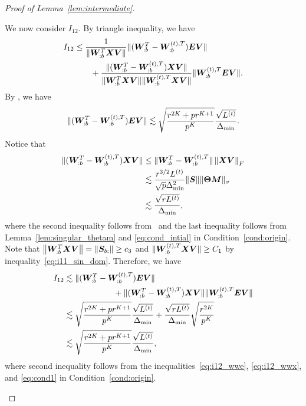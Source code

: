 \documentclass[journal]{IEEEtran}
\theoremstyle{definition}
\theoremstyle{definition}
\begin{document}
\begin{proof}[Proof of Lemma~\ref{lem:intermediate}]
\begin{enumerate}[wide]
    
    
    We now consider $I_{12}$. By triangle inequality, we have 
    \begin{align}
        I_{12} &\leq \frac{1}{\lVert  \bm{W}_{:b}^T \bm X \bm{V} \rVert}\lVert (\bm{W}_{:b}^T - \bm{W}_{:b}^{(t),T}) \bm{E} \bm{V} \rVert\\
        &\quad \quad + \frac{ \lVert(\bm{W}_{:b}^T - \bm{W}_{:b}^{(t),T}) \bm X \bm{V}\rVert }{\lVert  \bm{W}_{:b}^T \bm X \bm{V} \rVert \lVert  \bm{W}_{:b}^{(t),T} \bm X \bm{V} \rVert }\lVert \bm{W}_{:b}^{(t),T} \bm{E} \bm{V}\rVert.
    \end{align}
    By \cite[Proof of Lemma 5]{han2020exact}, we have 
    \begin{equation}\label{eq:i12_wwe}
        \onormSize{}{ (\mW_{:b}^T - \mW_{:b}^{(t),T}) \mE \mV }  \lesssim \sqrt{\frac{ r^{2K} + p r^{K+1}}{p^K}} \frac{\sqrt{L^{(t)}}}{\Delta_{\min}}.
    \end{equation}
    Notice that 
    \begin{align}
        \onormSize{}{(\mW_{:b}^T - \mW_{:b}^{(t),T}) \mX \mV} &\leq \onormSize{}{\mW_{:b}^T - \mW_{:b}^{(t),T}} \onorm{\mX\mV}_F \\
        &\lesssim \frac{r^{3/2}L^{(t)}}{\sqrt{p}\Delta_{\min}^2} \onormSize{}{\mS} \onormSize{}{\mTheta \mM}_{\sigma} \\
        &\lesssim \frac{ \sqrt{r L^{(t)}} }{\Delta_{\min}}, \label{eq:i12_wwx}
    \end{align}
    where the second inequality follows from~\cite[Inequality (121), Proof of Lemma 5]{han2020exact} and the last inequality follows from Lemma~\ref{lem:singular_thetam} and \eqref{eq:cond_intial} in Condition~\ref{cond:origin}.
     Note that $\left\lVert\bm{W}_{:b}^T \bm X \bm{V}\right\rVert = \left\lVert\bm S_{b:}\right\rVert \geq c_3$ and $\lVert  \bm{W}_{:b}^{(t),T} \bm X \bm{V} \rVert \geq C_1$ by inequality~\eqref{eq:i11_sin_dom}. Therefore, we have 
     \begin{align}
         I_{12} &\lesssim  \onormSize{}{ (\mW_{:b}^T - \mW_{:b}^{(t),T}) \mE \mV } \\
         & \quad \quad  \quad \quad  \quad \quad +   \onormSize{}{(\mW_{:b}^T - \mW_{:b}^{(t),T}) \mX \mV}   \onormSize{}{ \mW_{:b}^{(t),T} \mE \mV} \\
         &\lesssim \sqrt{\frac{ r^{2K} + p r^{K+1}}{p^K}} \frac{\sqrt{L^{(t)}}}{\Delta_{\min}} + \frac{ \sqrt{r L^{(t)}} }{\Delta_{\min}}\sqrt{\frac{r^{2K}}{p^K}} \\
         & \lesssim \sqrt{\frac{ r^{2K} + p r^{K+1}}{p^K}} \frac{\sqrt{L^{(t)}}}{\Delta_{\min}},\label{eq:i12}
     \end{align}
     where second inequality follows from the inequalities~\eqref{eq:i12_wwe}, \eqref{eq:i12_wwx}, and \eqref{eq:cond1} in Condition~\ref{cond:origin}.
     

\end{enumerate}
\end{proof}
\end{document}
